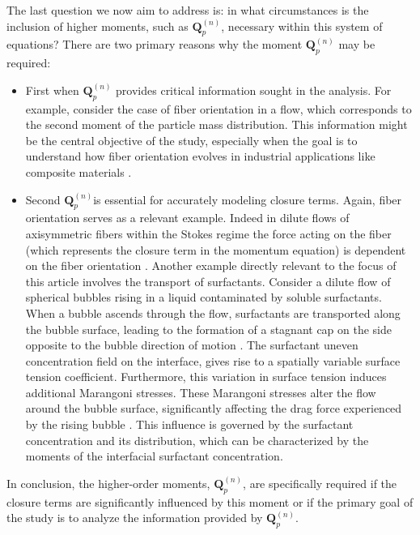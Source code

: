 \documentclass[11pt]{My_preprint}
\begin{document}
The last question we now aim to address is: in what circumstances is the inclusion of higher moments, such as $\textbf{Q}_p^{(n)}$, necessary within this system of equations?
There are two primary reasons why the moment $\textbf{Q}_p^{(n)}$ may be required:
\begin{itemize}
\item First when $\textbf{Q}_p^{(n)}$ provides critical information sought in the analysis. 
For example, consider the case of fiber orientation in a flow, which corresponds to the second moment of the particle mass distribution. 
This information might be the central objective of the study, especially when the goal is to understand how fiber orientation evolves in industrial applications like composite materials \citep{advani1987use}.

\item Second $\textbf{Q}_p^{(n)}$is essential for accurately modeling closure terms. 
Again, fiber orientation serves as a relevant example. 
Indeed in dilute flows of axisymmetric fibers within the Stokes regime the force acting on the fiber (which represents the closure term in the momentum equation) is dependent on the fiber orientation \citep{kim2013microhydrodynamics}. Another example directly relevant to the focus of this article involves the transport of surfactants. 
Consider a dilute flow of spherical bubbles rising in a liquid contaminated by soluble surfactants. 
When a bubble ascends through the flow, surfactants are transported along the bubble surface, leading to the formation of a stagnant cap on the side opposite to the bubble direction of motion \citep{cuenot1997effects}.
The surfactant uneven concentration field on the interface, gives rise to a spatially variable surface tension coefficient. 
Furthermore, this variation in surface tension induces additional Marangoni stresses. These Marangoni stresses alter the flow around the bubble surface, significantly affecting the drag force experienced by the rising bubble \citep{cuenot1997effects,pesci2018computational}. 
This influence is governed by the surfactant concentration and its distribution, which can be characterized by the moments of the interfacial surfactant concentration.





\end{itemize}
In conclusion, the higher-order moments, $\textbf{Q}_p^{(n)}$​, are specifically required if the closure terms are significantly influenced by this moment or if the primary goal of the study is to analyze the information provided by $\textbf{Q}_p^{(n)}$.
\end{document}
